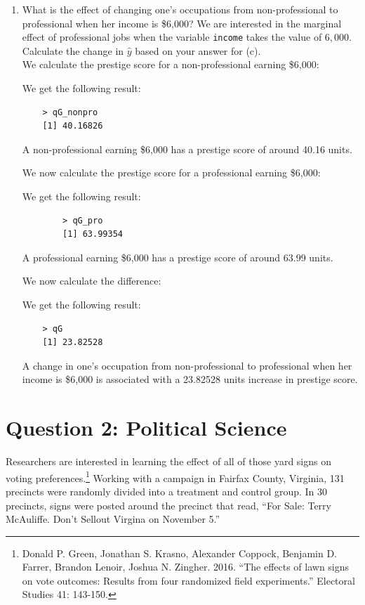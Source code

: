 \documentclass[12pt,letterpaper]{article}
\begin{document}
\begin{enumerate}
	\vspace{1cm}
	
	
	\item [(g)]
	What is the effect of changing one's occupations from non-professional to professional when her income is \$6,000? We are interested in the marginal effect of professional jobs when the variable \texttt{income} takes the value of $6,000$. Calculate the change in $\hat{y}$ based on your answer for (c). \\
	
	We calculate the prestige score for a non-professional earning \$6,000:
	 
	
	We get the following result:
	
	\begin{verbatim}
	> qG_nonpro
	[1] 40.16826
	\end{verbatim}
	A non-professional earning \$6,000 has a prestige score of around 40.16 units.
	
	We now calculate the prestige score for a professional earning \$6,000:
	 
	
	We get the following result:
	
	\begin{verbatim}
		> qG_pro
		[1] 63.99354
	\end{verbatim}
	A professional earning \$6,000 has a prestige score of around 63.99 units.
	
	We now calculate the difference:	
	 
	
	We get the following result:
	
	\begin{verbatim}
	> qG
	[1] 23.82528
	\end{verbatim}
	A change in one's occupation from non-professional to professional when her income is \$6,000 is associated with a 23.82528 units increase in prestige score.
	
	
	
	
\end{enumerate}

\newpage

\section*{Question 2: Political Science}
\vspace{.25cm}
\noindent 	Researchers are interested in learning the effect of all of those yard signs on voting preferences.\footnote{Donald P. Green, Jonathan	S. Krasno, Alexander Coppock, Benjamin D. Farrer,	Brandon Lenoir, Joshua N. Zingher. 2016. ``The effects of lawn signs on vote outcomes: Results from four randomized field experiments.'' Electoral Studies 41: 143-150. } Working with a campaign in Fairfax County, Virginia, 131 precincts were randomly divided into a treatment and control group. In 30 precincts, signs were posted around the precinct that read, ``For Sale: Terry McAuliffe. Don't Sellout Virgina on November 5.'' \\
\end{document}
